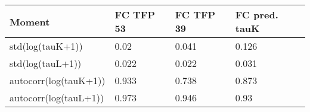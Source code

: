 \begin{tabular}{llll}
Moment & FC TFP 53 & FC TFP 39 & FC pred. tauK \\ 
\hline 
std(log(tauK+1)) & 0.02 & 0.041 & 0.126 \\ 
std(log(tauL+1)) & 0.022 & 0.022 & 0.031 \\ 
autocorr(log(tauK+1)) & 0.933 & 0.738 & 0.873 \\ 
autocorr(log(tauL+1)) & 0.973 & 0.946 & 0.93 \\ 
\hline 
\end{tabular}